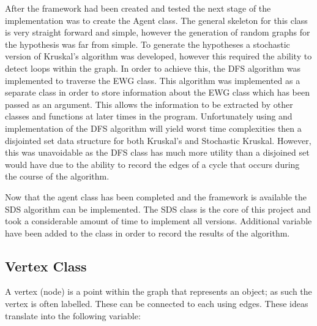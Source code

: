 \documentclass{AISB2008}
\begin{document}
{After the framework had been created and tested the next stage of the implementation was to create the Agent class. The general skeleton for this class is very straight forward and simple, however the generation of random graphs for the hypothesis was far from simple. To generate the hypotheses a stochastic version of Kruskal’s algorithm was developed, however this required the ability to detect loops within the graph. In order to achieve this, the DFS algorithm was implemented to traverse the EWG class. This algorithm was implemented as a separate class in order to store information about the EWG class which has been passed as an argument. This allows the information to be extracted by other classes and functions at later times in the program. Unfortunately using and implementation of the DFS algorithm will yield worst time complexities then a disjointed set data structure for both Kruskal’s and Stochastic Kruskal. However, this was unavoidable as the DFS class has much more utility than a disjoined set would have due to the ability to record the edges of a cycle that occurs during the course of the algorithm.

Now that the agent class has been completed and the framework is available the SDS algorithm can be implemented. The SDS class is the core of this project and took a considerable amount of time to implement all versions.  Additional variable have been added to the class in order to record the results of the algorithm.


\subsection{Vertex Class}

A vertex (node) is a point within the graph that represents an object; as such the vertex is often labelled. These can be connected to each using edges. These ideas translate into the following variable:

}
\end{document}
